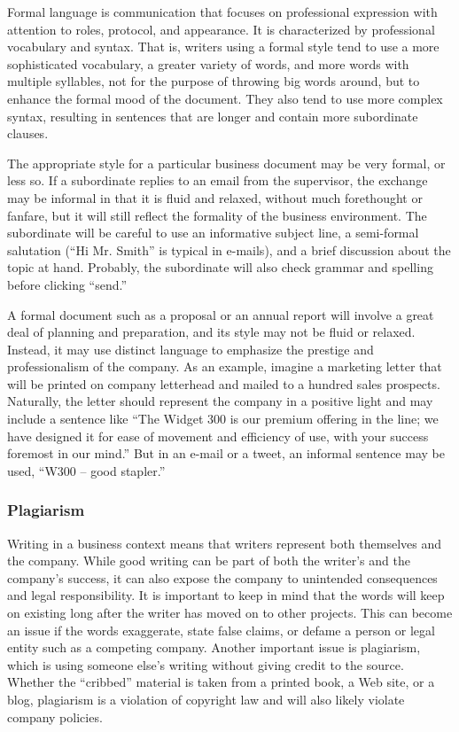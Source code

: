 Formal language is communication that focuses on professional expression with attention to roles, protocol, and appearance. It is characterized by professional vocabulary and syntax. That is, writers using a formal style tend to use a more sophisticated vocabulary, a greater variety of words, and more words with multiple syllables, not for the purpose of throwing big words around, but to enhance the formal mood of the document. They also tend to use more complex syntax, resulting in sentences that are longer and contain more subordinate clauses.

The appropriate style for a particular business document may be very formal, or less so. If a subordinate replies to an email from the supervisor, the exchange may be informal in that it is fluid and relaxed, without much forethought or fanfare, but it will still reflect the formality of the business environment. The subordinate will be careful to use an informative subject line, a semi-formal salutation (``Hi Mr. Smith'' is typical in e-mails), and a brief discussion about the topic at hand. Probably, the subordinate will also check grammar and spelling before clicking ``send.''

A formal document such as a proposal or an annual report will involve a great deal of planning and preparation, and its style may not be fluid or relaxed. Instead, it may use distinct language to emphasize the prestige and professionalism of the company. As an example, imagine a marketing letter that will be printed on company letterhead and mailed to a hundred sales prospects. Naturally, the letter should represent the company in a positive light and may include a sentence like ``The Widget 300 is our premium offering in the line; we have designed it for ease of movement and efficiency of use, with your success foremost in our mind.'' But in an e-mail or a tweet, an informal sentence may be used, ``W300 -- good stapler.''

\subsubsection{Plagiarism}

Writing in a business context means that writers represent both themselves and the company. While good writing can be part of both the writer's and the company's success, it can also expose the company to unintended consequences and legal responsibility. It is important to keep in mind that the words will keep on existing long after the writer has moved on to other projects. This can become an issue if the words exaggerate, state false claims, or defame a person or legal entity such as a competing company. Another important issue is plagiarism, which is using someone else's writing without giving credit to the source. Whether the ``cribbed'' material is taken from a printed book, a Web site, or a blog, plagiarism is a violation of copyright law and will also likely violate company policies. 

